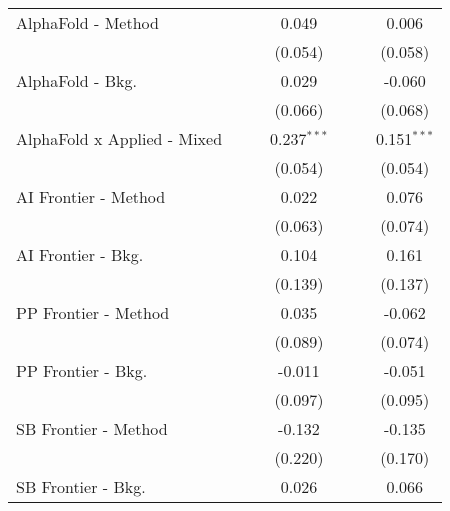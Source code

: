 \begin{tabular}{lcccccc}
   AlphaFold - Method             &         &              & 0.049         &         &               & 0.006\\   
                                  &         &              & (0.054)       &         &               & (0.058)\\   
   AlphaFold - Bkg.               &         &              & 0.029         &         &               & -0.060\\   
                                  &         &              & (0.066)       &         &               & (0.068)\\   
   AlphaFold x Applied - Mixed    &         &              & 0.237$^{***}$ &         &               & 0.151$^{***}$\\   
                                  &         &              & (0.054)       &         &               & (0.054)\\   
   AI Frontier - Method           &         &              & 0.022         &         &               & 0.076\\   
                                  &         &              & (0.063)       &         &               & (0.074)\\   
   AI Frontier - Bkg.             &         &              & 0.104         &         &               & 0.161\\   
                                  &         &              & (0.139)       &         &               & (0.137)\\   
   PP Frontier - Method           &         &              & 0.035         &         &               & -0.062\\   
                                  &         &              & (0.089)       &         &               & (0.074)\\   
   PP Frontier - Bkg.             &         &              & -0.011        &         &               & -0.051\\   
                                  &         &              & (0.097)       &         &               & (0.095)\\   
   SB Frontier - Method           &         &              & -0.132        &         &               & -0.135\\   
                                  &         &              & (0.220)       &         &               & (0.170)\\   
   SB Frontier - Bkg.             &         &              & 0.026         &         &               & 0.066\\   

\end{tabular}
